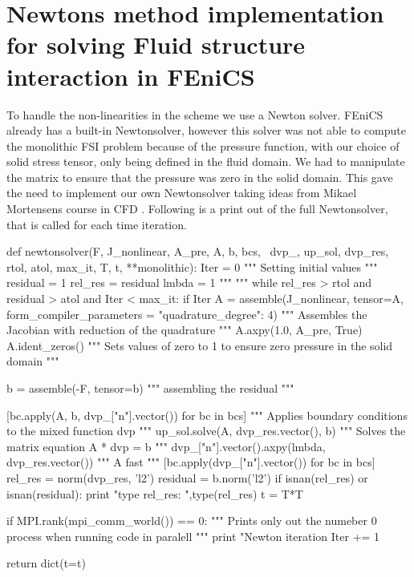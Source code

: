 \section{Newtons method implementation for solving Fluid structure interaction in FEniCS}
To handle the non-linearities in the scheme we use a Newton solver. FEniCS already has a built-in Newtonsolver, however this solver was not able to compute the monolithic FSI problem because of the pressure function, with our choice of solid stress tensor, only being defined in the fluid domain. We had to manipulate the matrix to ensure that the pressure was zero in the solid domain. This gave the need to implement our own Newtonsolver taking ideas from Mikael Mortensens course in CFD \cite{White2006}.
Following is a print out of the full Newtonsolver, that is called for each time iteration.
\newpage
\begin{python}
def newtonsolver(F, J_nonlinear, A_pre, A, b, bcs, \
                dvp_, up_sol, dvp_res, rtol, atol, max_it, T, t, **monolithic):
    Iter      = 0  """ Setting initial values """
    residual   = 1  
    rel_res    = residual
    lmbda = 1 """  """
    while rel_res > rtol and residual > atol and Iter < max_it:
        if Iter %
            A = assemble(J_nonlinear, tensor=A, form_compiler_parameters = {"quadrature_degree": 4}) """ Assembles the Jacobian with reduction of the quadrature """
            A.axpy(1.0, A_pre, True)
            A.ident_zeros()  """ Sets values of zero to 1 to ensure zero pressure in the solid domain """

        b = assemble(-F, tensor=b) """ assembling the residual  """

        [bc.apply(A, b, dvp_["n"].vector()) for bc in bcs] """ Applies boundary conditions to the mixed function dvp """
        up_sol.solve(A, dvp_res.vector(), b) """ Solves the matrix equation A * dvp = b """
        dvp_["n"].vector().axpy(lmbda, dvp_res.vector())   """ A fast   """
        [bc.apply(dvp_["n"].vector()) for bc in bcs] 
        rel_res = norm(dvp_res, 'l2')
        residual = b.norm('l2')                     
        if isnan(rel_res) or isnan(residual):
            print "type rel_res: ",type(rel_res)
            t = T*T

        if MPI.rank(mpi_comm_world()) == 0:   """ Prints only out the numeber 0 process when running code in paralell  """
            print "Newton iteration %
        Iter += 1

    return dict(t=t)
\end{python}




	